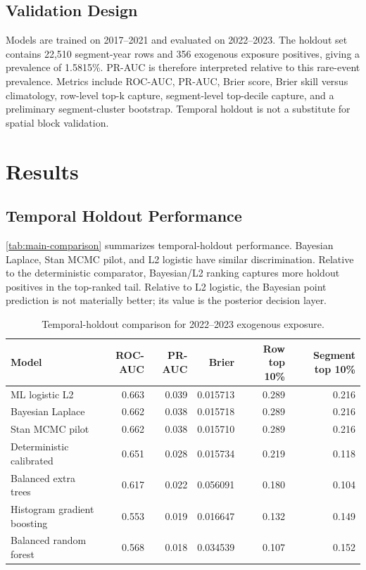 \documentclass[11pt]{article}
\begin{document}
\subsection{Validation Design}

Models are trained on 2017--2021 and evaluated on 2022--2023. The holdout set
contains 22,510 segment-year rows and 356 exogenous exposure positives, giving
a prevalence of 1.5815\%. PR-AUC is therefore interpreted relative to this
rare-event prevalence. Metrics include ROC-AUC, PR-AUC, Brier score, Brier
skill versus climatology, row-level top-k capture, segment-level top-decile
capture, and a preliminary segment-cluster bootstrap. Temporal holdout is not a
substitute for spatial block validation.

\section{Results}

\subsection{Temporal Holdout Performance}

\autoref{tab:main-comparison} summarizes temporal-holdout performance. Bayesian
Laplace, Stan MCMC pilot, and L2 logistic have similar discrimination. Relative
to the deterministic comparator, Bayesian/L2 ranking captures more holdout
positives in the top-ranked tail. Relative to L2 logistic, the Bayesian point
prediction is not materially better; its value is the posterior decision layer.

\begin{table}[!htbp]
  \centering
  \small
  \caption{Temporal-holdout comparison for 2022--2023 exogenous exposure.}
  \label{tab:main-comparison}
  \begin{tabular}{lrrrrr}
    \toprule
    Model & ROC-AUC & PR-AUC & Brier & Row top 10\% & Segment top 10\% \\
    \midrule
    ML logistic L2 & 0.663 & 0.039 & 0.015713 & 0.289 & 0.216 \\
    Bayesian Laplace & 0.662 & 0.038 & 0.015718 & 0.289 & 0.216 \\
    Stan MCMC pilot & 0.662 & 0.038 & 0.015710 & 0.289 & 0.216 \\
    Deterministic calibrated & 0.651 & 0.028 & 0.015734 & 0.219 & 0.118 \\
    Balanced extra trees & 0.617 & 0.022 & 0.056091 & 0.180 & 0.104 \\
    Histogram gradient boosting & 0.553 & 0.019 & 0.016647 & 0.132 & 0.149 \\
    Balanced random forest & 0.568 & 0.018 & 0.034539 & 0.107 & 0.152 \\
    \bottomrule
  \end{tabular}
\end{table}
\end{document}
